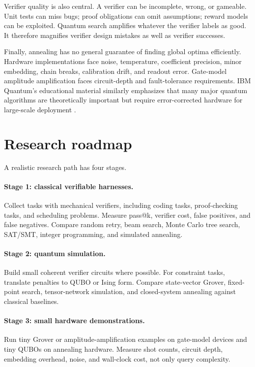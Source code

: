 \documentclass[11pt]{article}
\begin{document}
Verifier quality is also central. A verifier can be incomplete, wrong, or gameable. Unit tests can miss bugs; proof obligations can omit assumptions; reward models can be exploited. Quantum search amplifies whatever the verifier labels as good. It therefore magnifies verifier design mistakes as well as verifier successes.

Finally, annealing has no general guarantee of finding global optima efficiently. Hardware implementations face noise, temperature, coefficient precision, minor embedding, chain breaks, calibration drift, and readout error. Gate-model amplitude amplification faces circuit-depth and fault-tolerance requirements. IBM Quantum's educational material similarly emphasizes that many major quantum algorithms are theoretically important but require error-corrected hardware for large-scale deployment \cite{ibmQuantumApplications}.

\section{Research roadmap}

A realistic research path has four stages.

\paragraph{Stage 1: classical verifiable harnesses.} Collect tasks with mechanical verifiers, including coding tasks, proof-checking tasks, and scheduling problems. Measure pass@k, verifier cost, false positives, and false negatives. Compare random retry, beam search, Monte Carlo tree search, SAT/SMT, integer programming, and simulated annealing.

\paragraph{Stage 2: quantum simulation.} Build small coherent verifier circuits where possible. For constraint tasks, translate penalties to QUBO or Ising form. Compare state-vector Grover, fixed-point search, tensor-network simulation, and closed-system annealing against classical baselines.

\paragraph{Stage 3: small hardware demonstrations.} Run tiny Grover or amplitude-amplification examples on gate-model devices and tiny QUBOs on annealing hardware. Measure shot counts, circuit depth, embedding overhead, noise, and wall-clock cost, not only query complexity.
\end{document}

